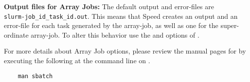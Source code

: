 \textbf{Output files for Array Jobs:} The default output and error-files are\\
\texttt{slurm-job\_id\_task\_id.out}.
This means that Speed creates an output and an error-file for each task generated by the array-job,
as well as one for the super-ordinate array-job.
To alter this behavior use the  and  options of .

For more details about Array Job options, please review the manual pages for 
by executing the following at the command line on .
\begin{verbatim}
    man sbatch
\end{verbatim}